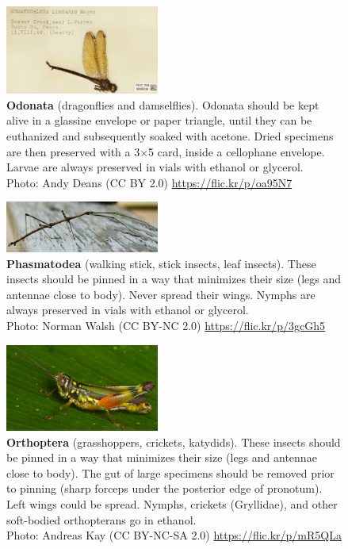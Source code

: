 \documentclass[letterpaper, 11pt]{article}
\begin{document}
\begin{figure}
  \caption{\textbf{Odonata} (dragonflies and damselflies). Odonata should be kept alive in a glassine envelope or paper triangle, until they can be euthanized and subsequently soaked with acetone. Dried specimens are then preserved with a 3$\times$5 card, inside a cellophane envelope. Larvae are always preserved in vials with ethanol or glycerol.\\ Photo: Andy Deans (CC BY 2.0) \url{https://flic.kr/p/oa95N7}}
  \includegraphics[width=0.45\textwidth]{Odonata}
\end{figure}

\begin{figure}
  \caption{\textbf{Phasmatodea} (walking stick, stick insects, leaf insects). These insects should be pinned in a way that minimizes their size (legs and antennae close to body). Never spread their wings. Nymphs are always preserved in vials with ethanol or glycerol. \\ Photo: Norman Walsh (CC BY-NC 2.0) \url{https://flic.kr/p/3gcGh5}}
  \includegraphics[width=0.45\textwidth]{Phasmatodea}
\end{figure}

\begin{figure}
  \caption{\textbf{Orthoptera} (grasshoppers, crickets, katydids). These insects should be pinned in a way that minimizes their size (legs and antennae close to body). The gut of large specimens should be removed prior to pinning (sharp forceps under the posterior edge of pronotum). Left wings could be spread. Nymphs, crickets (Gryllidae), and other soft-bodied orthopterans go in ethanol.\\ Photo: Andreas Kay (CC BY-NC-SA 2.0) \url{https://flic.kr/p/mR5QLa}}
  \includegraphics[width=0.45\textwidth]{Orthoptera}
\end{figure}
\end{document}
